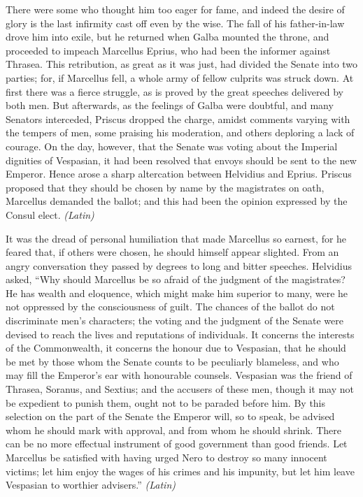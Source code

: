 
There were some who thought him too eager for fame, and indeed the desire of glory is the last infirmity cast off even by the wise. The fall of his father-in-law drove him into exile, but he returned when Galba mounted the throne, and proceeded to impeach Marcellus Eprius, who had been the informer against Thrasea. This retribution, as great as it was just, had divided the Senate into two parties; for, if Marcellus fell, a whole army of fellow culprits was struck down. At first there was a fierce struggle, as is proved by the great speeches delivered by both men. But afterwards, as the feelings of Galba were doubtful, and many Senators interceded, Priscus dropped the charge, amidst comments varying with the tempers of men, some praising his moderation, and others deploring a lack of courage. On the day, however, that the Senate was voting about the Imperial dignities of Vespasian, it had been resolved that envoys should be sent to the new Emperor. Hence arose a sharp altercation between Helvidius and Eprius. Priscus proposed that they should be chosen by name by the magistrates on oath, Marcellus demanded the ballot; and this had been the opinion expressed by the Consul elect. \emph{(Latin)}


It was the dread of personal humiliation that made Marcellus so earnest, for he feared that, if others were chosen, he should himself appear slighted. From an angry conversation they passed by degrees to long and bitter speeches. Helvidius asked, ``Why should Marcellus be so afraid of the judgment of the magistrates? He has wealth and eloquence, which might make him superior to many, were he not oppressed by the consciousness of guilt. The chances of the ballot do not discriminate men's characters; the voting and the judgment of the Senate were devised to reach the lives and reputations of individuals. It concerns the interests of the Commonwealth, it concerns the honour due to Vespasian, that he should be met by those whom the Senate counts to be peculiarly blameless, and who may fill the Emperor's ear with honourable counsels. Vespasian was the friend of Thrasea, Soranus, and Sextius; and the accusers of these men, though it may not be expedient to punish them, ought not to be paraded before him. By this selection on the part of the Senate the Emperor will, so to speak, be advised whom he should mark with approval, and from whom he should shrink. There can be no more effectual instrument of good government than good friends. Let Marcellus be satisfied with having urged Nero to destroy so many innocent victims; let him enjoy the wages of his crimes and his impunity, but let him leave Vespasian to worthier advisers.'' \emph{(Latin)}


